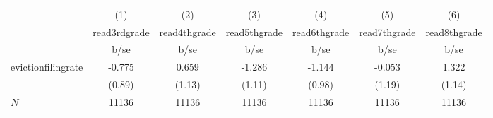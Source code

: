 {
\def\sym#1{\ifmmode^{#1}\else\(^{#1}\)\fi}
\begin{tabular}{l*{6}{c}}
\hline\hline
            &\multicolumn{1}{c}{(1)}           &\multicolumn{1}{c}{(2)}           &\multicolumn{1}{c}{(3)}           &\multicolumn{1}{c}{(4)}           &\multicolumn{1}{c}{(5)}           &\multicolumn{1}{c}{(6)}           \\
            &\multicolumn{1}{c}{read3rdgrade}  &\multicolumn{1}{c}{read4thgrade}  &\multicolumn{1}{c}{read5thgrade}  &\multicolumn{1}{c}{read6thgrade}  &\multicolumn{1}{c}{read7thgrade}  &\multicolumn{1}{c}{read8thgrade}  \\
            &                     b/se         &                     b/se         &                     b/se         &                     b/se         &                     b/se         &                     b/se         \\
\hline
evictionfilingrate&                   -0.775         &                    0.659         &                   -1.286         &                   -1.144         &                   -0.053         &                    1.322         \\
            &                   (0.89)         &                   (1.13)         &                   (1.11)         &                   (0.98)         &                   (1.19)         &                   (1.14)         \\
\hline
\(N\)       &                    11136         &                    11136         &                    11136         &                    11136         &                    11136         &                    11136         \\
\hline\hline
\end{tabular}
}
